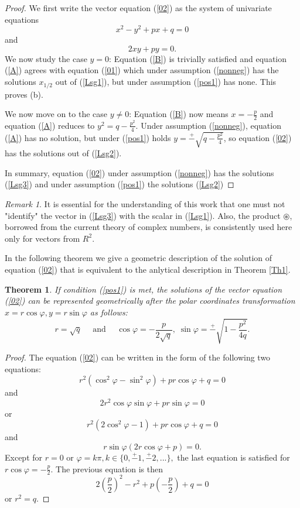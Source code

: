 \documentclass{amsart}
\newtheorem{thm}{Theorem}[section]
\theoremstyle{definition}
\theoremstyle{remark}
\newtheorem{remark}{Remark}
\numberwithin{equation}{section}
\begin{document}
\begin{proof}We first write the vector equation (\ref{02}) as the system of univariate equations
\begin{equation}\label{A}
x^2-y^2+px+q=0
\end{equation}
and
\begin{equation}\label{B}
2xy+py=0.
\end{equation}
We now study the case $y=0$: Equation (\ref{B}) is trivially satisfied and equation (\ref{A}) agrees with equation (\ref{01}) which under assumption (\ref{nonneg}) has the solutions $x_{1/2}$ out of (\ref{Lsg1}), but under assumption (\ref{pos1}) has none. This proves (b).

We now move on to the case $y\neq 0$: Equation (\ref{B}) now means $x=-\frac{p}{2}$ and equation (\ref{A}) reduces to $y^2=q-\frac{p^2}{4}$. Under assumption (\ref{nonneg}), equation (\ref{A}) has no solution, but under (\ref{pos1}) holds $y=\overset{+}-\sqrt{q-\frac{p^2}{4}}$, so equation (\ref{02}) has the solutions out of (\ref{Lsg2}).

In summary, equation (\ref{02}) under assumption (\ref{nonneg}) has the solutions (\ref{Lsg3}) and under assumption (\ref{pos1}) the solutions (\ref{Lsg2})
\end{proof}
\begin{remark}
 It is essential for the understanding of this work that one must not "identify" the vector in (\ref{Lsg3}) with the scalar in (\ref{Lsg1}). Also, the product $\circledast$, borrowed from the current theory of complex numbers, is consistently used here only for vectors from $R^2$.
\end{remark}
In the following theorem we give a geometric description of the solution of equation (\ref{02}) that is equivalent to the anlytical description in Theorem \ref{Th1}.
\begin{thm}\label{Th2}
If condition (\ref{pos1}) is met, the solutions of the vector equation (\ref{02}) can be represented geometrically after the polar coordinates transformation $x=r  \cos\varphi, y=r  \sin\varphi$ as follows:
\begin{equation}\label{Los}
r=\sqrt{q} \quad\text{ and }\quad \cos\varphi=-\frac{p}{2\sqrt{q}},\; \sin\varphi=\overset{+}-\sqrt{1-\frac{p^2}{4{q}}}.
\end{equation}
\end{thm}
\begin{proof}The  equation (\ref{02}) can be written in the form of the following two equations:
\[
r^2(  \cos^2\varphi-\sin^2\varphi)+pr\cos\varphi+q=0
\]
and
\[
2r^2  \cos\varphi\sin\varphi+pr\sin\varphi=0
\]
or
\[
r^2 (2 \cos^2\varphi-1)+pr\cos\varphi+q=0
\]
and
\[
r\sin\varphi(2r\cos\varphi+p)=0.
\]
Except for $r=0$ or $\varphi=k\pi, k\in\{0,\overset{+}-1,\overset{+}-2,...\},$ the last equation is satisfied for $r\cos\varphi=-\frac{p}{2}.$
The previous equation is then
\[2(\frac{p}{2})^2-r^2+p(-\frac{p}{2})+q=0\]
or $r^2=q. $
\end{proof}
\end{document}
